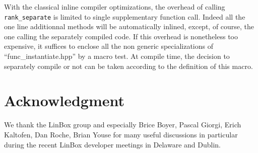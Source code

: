 \documentclass[runningheads,a4paper]{llncs}
\newcommand{\linboxsp}{{\sc LinBox}\xspace}
\begin{document}
\begin{remark} 
With the classical inline compiler optimizations, the overhead of
calling \texttt{rank\_separate} is limited to single supplementary
function call. Indeed all the one line additionnal methods will be
automatically inlined, except, of course, the one calling the separately
compiled code.
If this overhead is nonetheless too expensive, it suffices to enclose all the non generic specializations of
``func\_instantiate.hpp'' by a macro test. 
At compile time, the decision to separately
compile or not can be taken according to the definition of this
macro. 
\end{remark}

\section*{Acknowledgment}
We thank the \linboxsp group and especially Brice Boyer, Pascal Giorgi,
Erich Kaltofen, Dan Roche, Brian Youse for many useful discussions 
in particular during the recent \linboxsp developer meetings in
Delaware and Dublin.



 
\end{document}
